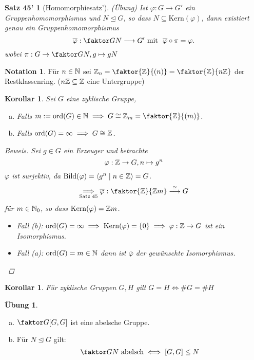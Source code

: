 \documentclass[a4paper]{article}
\theoremstyle{plain}
\newtheorem*{satz45'}{Satz 45'}
\newtheorem{kor}[thm]{Korollar}
\theoremstyle{definition}
\newtheorem*{nota*}{Notation}
\newtheorem*{ubng*}{Übung}
\begin{document}
\begin{satz45'}[Homomorphiesatz'](Übung)
  Ist $\varphi : G \to G'$ ein Gruppenhomomorphismus und $N \trianglelefteq G$, so dass $N \subseteq \mathrm{Kern}(\varphi)$, dann existiert genau ein Gruppenhomomorphismus $$\overline\varphi : \faktor GN \longrightarrow G'\text{ mit }\ \overline\varphi \circ \pi = \varphi.$$
  wobei $\pi : G \to \faktor GN, g \mapsto gN$
\end{satz45'}
\begin{nota*}
Für $n \in \Bbb N$ sei $\Bbb Z_{n} = \faktor {\Bbb Z}{(n)} = \faktor{\Bbb Z}{n\Bbb Z}$ der Restklassenring. ($n\Bbb Z \subseteq \Bbb Z $ eine Untergruppe)
\end{nota*}

\begin{kor}
  Sei $G$ eine zyklische Gruppe,
  \begin{enumerate}[(a)]
    \item Falls $m:= \mathrm{ord}(G) \in \Bbb N \implies G \cong \Bbb Z_{m} = \faktor{\Bbb Z}{(m)}$.
          \item Falls $\mathrm{ord}(G) = \infty \implies G \cong \Bbb Z$.
  \end{enumerate}
\begin{proof}[Beweis]
  Sei $g \in G$ ein Erzeuger und betrachte $$\varphi : \Bbb Z \to G, n \mapsto g^{n}$$
  $\varphi$ ist surjektiv, da $\mathrm{Bild}(\varphi) = \langle g^{n} \mid n \in \Bbb Z \rangle = G$.
  $$\underset{\text{Satz 45}}\implies \overline\varphi : \faktor{\Bbb Z}{\Bbb Zm} \overset \cong \longrightarrow{} G$$
  für $m \in \Bbb N_{0}$, so dass $\mathrm{Kern}(\varphi) = \Bbb Zm$.
  \begin{itemize}
\item Fall (b): $\mathrm{ord}(G) = \infty \implies \mathrm{Kern}(\varphi) = \{0\} \implies \varphi : \Bbb Z \to G$ ist ein Isomorphismus.
\item Fall (a): $\mathrm{ord}(G) = m \in \Bbb N$ dann ist $\overline\varphi$ der gewünschte Isomorphismus.
 \end{itemize}
\end{proof}
\end{kor}
\begin{kor}Für zyklische Gruppen $G, H$ gilt $G = H \iff \#G = \#H$
\end{kor}
\begin{ubng*}
\begin{enumerate}[(a)]
  \item $\faktor G{[G, G]}$ ist eine abelsche Gruppe.
  \item Für $N \trianglelefteq G$ gilt:
        $$\faktor GN \text{ abelsch} \iff [G, G] \le N$$
\end{enumerate}
\end{ubng*}
\end{document}

